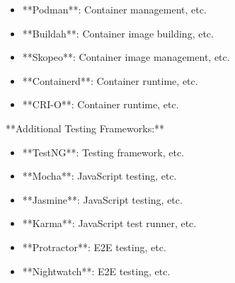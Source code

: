 \documentclass[11pt,a4paper]{article}
\begin{document}
\begin{itemize}
\item **Podman**: Container management, etc.
\end{itemize}

\begin{itemize}
\item **Buildah**: Container image building, etc.
\end{itemize}

\begin{itemize}
\item **Skopeo**: Container image management, etc.
\end{itemize}

\begin{itemize}
\item **Containerd**: Container runtime, etc.
\end{itemize}

\begin{itemize}
\item **CRI-O**: Container runtime, etc.
\end{itemize}

**Additional Testing Frameworks:**

\begin{itemize}
\item **TestNG**: Testing framework, etc.
\end{itemize}

\begin{itemize}
\item **Mocha**: JavaScript testing, etc.
\end{itemize}

\begin{itemize}
\item **Jasmine**: JavaScript testing, etc.
\end{itemize}

\begin{itemize}
\item **Karma**: JavaScript test runner, etc.
\end{itemize}

\begin{itemize}
\item **Protractor**: E2E testing, etc.
\end{itemize}

\begin{itemize}
\item **Nightwatch**: E2E testing, etc.
\end{itemize}
\end{document}
